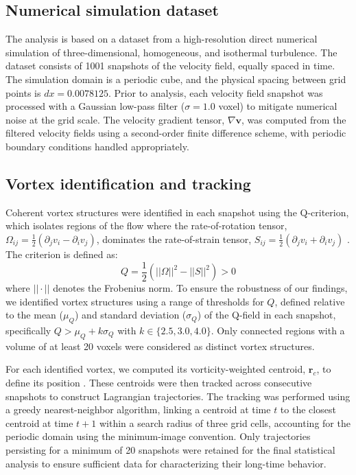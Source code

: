 \documentclass[]{article}
\begin{document}
\subsection{Numerical simulation dataset}

The analysis is based on a dataset from a high-resolution direct numerical simulation of three-dimensional, homogeneous, and isothermal turbulence. The dataset consists of 1001 snapshots of the velocity field, equally spaced in time. The simulation domain is a periodic cube, and the physical spacing between grid points is $dx=0.0078125$. Prior to analysis, each velocity field snapshot was processed with a Gaussian low-pass filter ($\sigma=1.0$ voxel) to mitigate numerical noise at the grid scale. The velocity gradient tensor, $\nabla \mathbf{v}$, was computed from the filtered velocity fields using a second-order finite difference scheme, with periodic boundary conditions handled appropriately.

\subsection{Vortex identification and tracking}

Coherent vortex structures were identified in each snapshot using the Q-criterion, which isolates regions of the flow where the rate-of-rotation tensor, $\Omega_{ij} = \frac{1}{2}(\partial_j v_i - \partial_i v_j)$, dominates the rate-of-strain tensor, $S_{ij} = \frac{1}{2}(\partial_j v_i + \partial_i v_j)$ \citep{menon2021significancestraindominatedregionvortex}. The criterion is defined as:
\begin{equation}
Q = \frac{1}{2} \left( ||\Omega||^2 - ||S||^2 \right) > 0
\end{equation}
where $||\cdot||$ denotes the Frobenius norm. To ensure the robustness of our findings, we identified vortex structures using a range of thresholds for $Q$, defined relative to the mean ($\mu_Q$) and standard deviation ($\sigma_Q$) of the Q-field in each snapshot, specifically $Q > \mu_Q + k\sigma_Q$ with $k \in \{2.5, 3.0, 4.0\}$. Only connected regions with a volume of at least 20 voxels were considered as distinct vortex structures.

For each identified vortex, we computed its vorticity-weighted centroid, $\mathbf{r}_c$, to define its position \citep{kashyap2026emergencelocalorderinggiant}. These centroids were then tracked across consecutive snapshots to construct Lagrangian trajectories. The tracking was performed using a greedy nearest-neighbor algorithm, linking a centroid at time $t$ to the closest centroid at time $t+1$ within a search radius of three grid cells, accounting for the periodic domain using the minimum-image convention. Only trajectories persisting for a minimum of 20 snapshots were retained for the final statistical analysis to ensure sufficient data for characterizing their long-time behavior.
\end{document}
